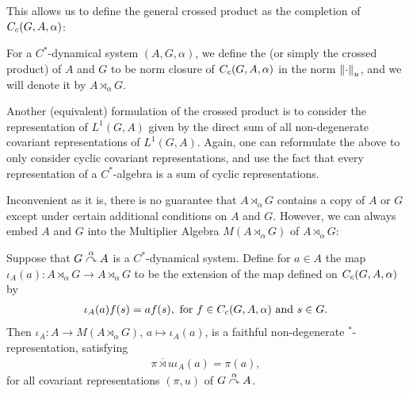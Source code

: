 This allows us to define the general crossed product as the completion of $C_c(G,A,\alpha)$:
\begin{definition}
	For a $C^*$-dynamical system $(A,G,\alpha)$, we define the  (or simply the crossed product) of $A$ and $G$ to be norm closure of $C_c(G,A,\alpha)$ in the norm $\left\lVert \cdot \right\rVert_u$, and we will denote it by $A \rtimes_\alpha G$.
\end{definition}
\begin{remark}
	Another (equivalent) formulation of the crossed product is to consider the representation of $L^1(G,A)$ given by the direct sum of all non-degenerate covariant representations of $L^1(G,A)$. Again, one can reformulate the above to only consider cyclic covariant representations, and use the fact that every representation of a $C^*$-algebra is a sum of cyclic representations.
\end{remark}
Inconvenient as it is, there is no guarantee that $A \rtimes_\alpha G$ contains a copy of $A$ or $G$ except under certain additional conditions on $A$ and $G$. However, we can always embed $A$ and $G$ into the Multiplier Algebra $M(A \rtimes_\alpha G)$ of $A \rtimes_\alpha G$:
\begin{lemma}
	Suppose that $G \stackrel{\alpha}{\curvearrowright} A$ is a $C^*$-dynamical system. Define for $a \in A$ the map $\iota_A(a) \colon A \rtimes_\alpha G \to A \rtimes_\alpha G$ to be the extension of the map defined on $C_c(G,A,\alpha)$ by
	\begin{align*}
		\iota_A(a) f(s) = af(s), \text{ for } f \in C_c(G,A,\alpha) \text{ and } s \in G.
	\end{align*}
	Then $\iota_A \colon A \to M(A \rtimes_\alpha G)$, $a \mapsto \iota_A(a)$, is a faithful non-degenerate $^*$-representation, satisfying
	\begin{align*}
		\overline{\pi \rtimes u } \iota_A(a) = \pi(a),
	\end{align*}
	for all covariant representations $(\pi,u)$ of $G \stackrel{\alpha}{\curvearrowright} A $.
\end{lemma}
